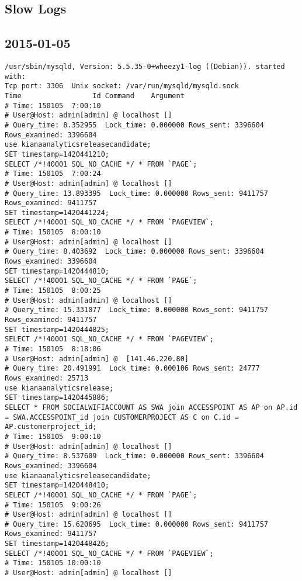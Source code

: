 \begin{appendix}
\section{Slow Logs}

\subsection{2015-01-05}
\begin{footnotesize}
\begin{verbatim}
/usr/sbin/mysqld, Version: 5.5.35-0+wheezy1-log ((Debian)). started with:
Tcp port: 3306  Unix socket: /var/run/mysqld/mysqld.sock
Time                 Id Command    Argument
# Time: 150105  7:00:10
# User@Host: admin[admin] @ localhost []
# Query_time: 8.352955  Lock_time: 0.000000 Rows_sent: 3396604  Rows_examined: 3396604
use kianaanalyticsreleasecandidate;
SET timestamp=1420441210;
SELECT /*!40001 SQL_NO_CACHE */ * FROM `PAGE`;
# Time: 150105  7:00:24
# User@Host: admin[admin] @ localhost []
# Query_time: 13.893395  Lock_time: 0.000000 Rows_sent: 9411757  Rows_examined: 9411757
SET timestamp=1420441224;
SELECT /*!40001 SQL_NO_CACHE */ * FROM `PAGEVIEW`;
# Time: 150105  8:00:10
# User@Host: admin[admin] @ localhost []
# Query_time: 8.403692  Lock_time: 0.000000 Rows_sent: 3396604  Rows_examined: 3396604
SET timestamp=1420444810;
SELECT /*!40001 SQL_NO_CACHE */ * FROM `PAGE`;
# Time: 150105  8:00:25
# User@Host: admin[admin] @ localhost []
# Query_time: 15.331077  Lock_time: 0.000000 Rows_sent: 9411757  Rows_examined: 9411757
SET timestamp=1420444825;
SELECT /*!40001 SQL_NO_CACHE */ * FROM `PAGEVIEW`;
# Time: 150105  8:18:06
# User@Host: admin[admin] @  [141.46.220.80]
# Query_time: 20.491991  Lock_time: 0.000106 Rows_sent: 24777  Rows_examined: 25713
use kianaanalyticsrelease;
SET timestamp=1420445886;
SELECT * FROM SOCIALWIFIACCOUNT AS SWA join ACCESSPOINT AS AP on AP.id = SWA.ACCESSPOINT_id join CUSTOMERPROJECT AS C on C.id = AP.customerproject_id;
# Time: 150105  9:00:10
# User@Host: admin[admin] @ localhost []
# Query_time: 8.537609  Lock_time: 0.000000 Rows_sent: 3396604  Rows_examined: 3396604
use kianaanalyticsreleasecandidate;
SET timestamp=1420448410;
SELECT /*!40001 SQL_NO_CACHE */ * FROM `PAGE`;
# Time: 150105  9:00:26
# User@Host: admin[admin] @ localhost []
# Query_time: 15.620695  Lock_time: 0.000000 Rows_sent: 9411757  Rows_examined: 9411757
SET timestamp=1420448426;
SELECT /*!40001 SQL_NO_CACHE */ * FROM `PAGEVIEW`;
# Time: 150105 10:00:10
# User@Host: admin[admin] @ localhost []

\end{verbatim}
\end{footnotesize}
\end{appendix}

